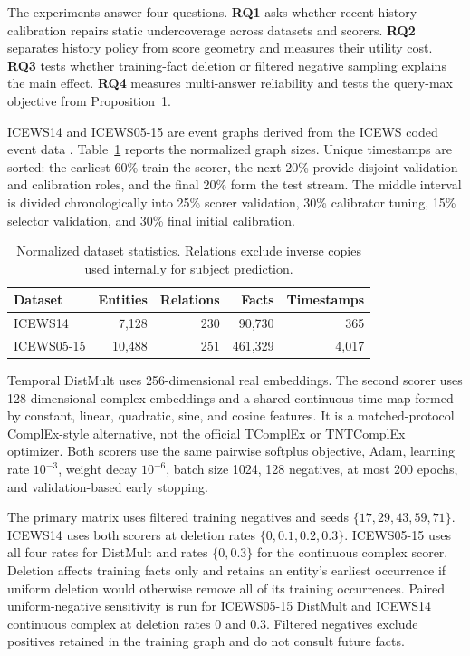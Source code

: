 \documentclass[information,article,submit,oneauthor,pdftex]{Definitions/mdpi}
\begin{document}
The experiments answer four questions. \textbf{RQ1} asks whether recent-history
calibration repairs static undercoverage across datasets and scorers.
\textbf{RQ2} separates history policy from score geometry and measures their
utility cost. \textbf{RQ3} tests whether training-fact deletion or filtered
negative sampling explains the main effect. \textbf{RQ4} measures multi-answer
reliability and tests the query-max objective from Proposition~1.

ICEWS14 and ICEWS05-15 are event graphs derived from the ICEWS coded event data
\cite{boschee2015icews}. Table~\ref{tab:data} reports the normalized graph
sizes. Unique timestamps are sorted: the earliest 60\% train the scorer, the
next 20\% provide disjoint validation and calibration roles, and the final
20\% form the test stream. The middle interval is divided chronologically into
25\% scorer validation, 30\% calibrator tuning, 15\% selector validation, and
30\% final initial calibration.

\begin{table}[t]
\centering
\caption{Normalized dataset statistics. Relations exclude inverse copies used
internally for subject prediction.\label{tab:data}}
\begin{tabular}{lrrrr}
\toprule
Dataset & Entities & Relations & Facts & Timestamps\\
\midrule
ICEWS14 & 7,128 & 230 & 90,730 & 365\\
ICEWS05-15 & 10,488 & 251 & 461,329 & 4,017\\
\bottomrule
\end{tabular}
\end{table}

Temporal DistMult uses 256-dimensional real embeddings. The second scorer uses
128-dimensional complex embeddings and a shared continuous-time map formed by
constant, linear, quadratic, sine, and cosine features. It is a
matched-protocol ComplEx-style alternative, not the official TComplEx or
TNTComplEx optimizer. Both scorers use the same pairwise softplus objective,
Adam, learning rate \(10^{-3}\), weight decay \(10^{-6}\), batch size 1024,
128 negatives, at most 200 epochs, and validation-based early stopping.

The primary matrix uses filtered training negatives and seeds
\(\{17,29,43,59,71\}\). ICEWS14 uses both scorers at deletion rates
\(\{0,0.1,0.2,0.3\}\). ICEWS05-15 uses all four rates for DistMult and rates
\(\{0,0.3\}\) for the continuous complex scorer. Deletion affects training
facts only and retains an entity's earliest occurrence if uniform deletion
would otherwise remove all of its training occurrences. Paired
uniform-negative sensitivity is run for ICEWS05-15 DistMult and ICEWS14
continuous complex at deletion rates 0 and 0.3. Filtered negatives exclude
positives retained in the training graph and do not consult future facts.
\end{document}
